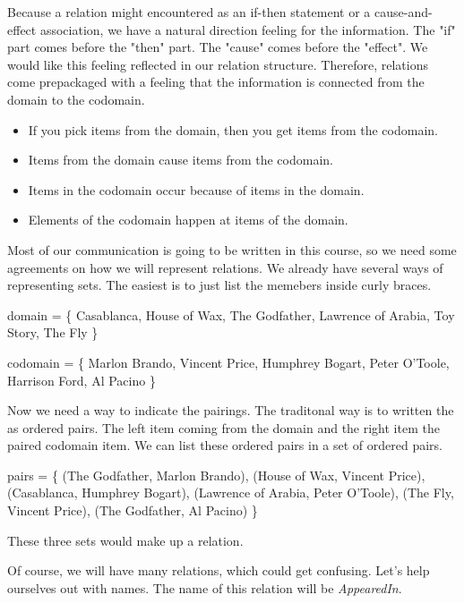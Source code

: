 \documentclass{ximera}
\begin{document}
Because a relation might encountered as an if-then statement or a cause-and-effect association, we have a natural direction feeling for the information.  The "if" part comes before the "then" part.  The "cause" comes before the "effect".  We would like this feeling reflected in our relation structure.  Therefore, relations come prepackaged with a feeling that the information is connected from the domain to the codomain.

\begin{itemize}
\item If you pick items from the domain, then you get items from the codomain.
\item Items from the domain cause items from the codomain.
\item Items in the codomain occur because of items in the domain.
\item Elements of the codomain happen at items of the domain.
\end{itemize}



Most of our communication is going to be written in this course, so we need some agreements on how we will represent relations.  We already have several ways of representing sets.  The easiest is to just list the memebers inside curly braces.

\begin{center} 
domain = \{ Casablanca, House of Wax,  The Godfather, Lawrence of Arabia, Toy Story, The Fly \} 
\end{center}

\begin{center} 
codomain = \{ Marlon Brando, Vincent Price, Humphrey Bogart, Peter O'Toole, Harrison Ford, Al Pacino \} 
\end{center}

Now we need a way to indicate the pairings.  The traditonal way is to written the as ordered pairs.  The left item coming from the domain and the right item the paired codomain item.  We can list these ordered pairs in a set of ordered pairs.

\begin{center} 
pairs = \{ (The Godfather, Marlon Brando), (House of Wax, Vincent Price), (Casablanca, Humphrey Bogart), (Lawrence of Arabia, Peter O'Toole), (The Fly, Vincent Price), (The Godfather, Al Pacino) \} 
\end{center}


These three sets would make up a relation. 

Of course, we will have many relations, which could get confusing.  Let's help ourselves out with names.  The name of this relation will be \textit{AppearedIn}.
\end{document}

